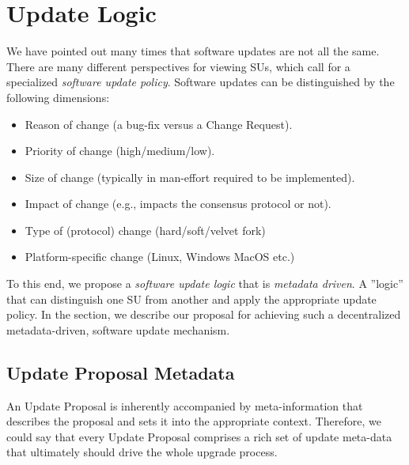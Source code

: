 \section{Update Logic}
We have pointed out many times that software updates are not all the same. There are many different perspectives for viewing SUs, which call for a specialized \emph{software update policy}. Software updates can be distinguished by the following dimensions:
\begin{itemize}
\item Reason of change (a bug-fix versus a Change Request).
\item Priority of change (high/medium/low).
\item Size of change (typically in man-effort required to be implemented).
\item Impact of change (e.g., impacts the consensus protocol or not).
\item Type of (protocol) change (hard/soft/velvet fork)
\item Platform-specific change (Linux, Windows MacOS etc.)
\end{itemize}
To this end, we propose a \emph{software update logic} that is \emph{metadata driven}. A ''logic'' that can distinguish one SU from another and apply the appropriate update policy. In the section, we describe our proposal for achieving such a decentralized metadata-driven, software update mechanism.

\subsection{Update Proposal Metadata} 
An Update Proposal is inherently accompanied by meta-information that describes the proposal and sets it into the appropriate context. Therefore, we could say that every Update Proposal comprises a rich set of update meta-data that ultimately should drive the whole upgrade process.

